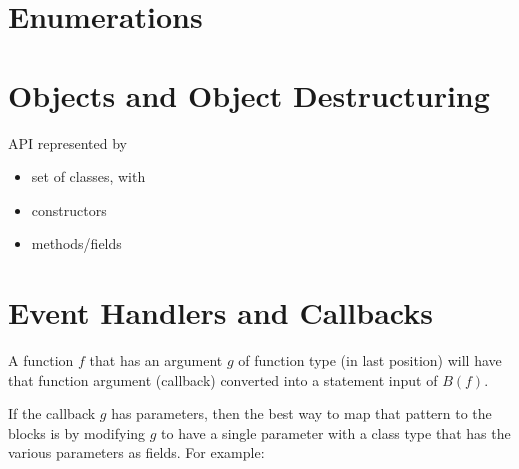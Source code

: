 \documentclass[sigplan,10pt]{acmart}
\begin{document}
\section{Enumerations}

\section{Objects and Object Destructuring}
API represented by
\begin{itemize}
  \item set of classes, with
  \item constructors
  \item methods/fields
\end{itemize}

\section{Event Handlers and Callbacks}


A function $f$ that has an argument $g$ of function type (in last position) will have
that function argument (callback) converted into a statement input of $B(f)$.

If the callback $g$ has parameters, then
the best way to map that pattern to the blocks is by modifying
$g$ to have a single parameter with a class type that has the
various parameters as fields.
For example:





\end{document}
